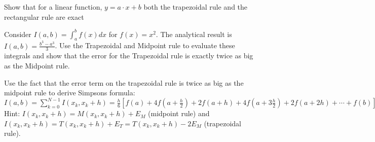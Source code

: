 \documentclass[graybox,sectrefs,envcountresetchap,open=right,final]{svmonodo}
\makeatletter
\newenvironment{doconceexercise}{}{}
\newcounter{doconceexercisecounter}%
\newcommand\listofexercises{
\chapter*{List of Exercises
          \@mkboth{List of Exercises}{List of Exercises}}
\markboth{List of Exercises}{List of Exercises}
\@starttoc{loe}
}
\makeatother
\begin{document}
\begin{doconceexercise}

                             


Show that for a linear function, $y=a\cdot x+b$ both the trapezoidal rule and the rectangular rule are exact



Consider $I(a,b)=\int_a^bf(x)dx$ for $f(x)=x^2$. The analytical result is $I(a,b)=\frac{b^3-a^3}{3}$. Use the Trapezoidal and 
  Midpoint rule to evaluate these integrals and show that the error for the Trapezoidal rule is exactly twice as big as the Midpoint rule.



Use the fact that the error term on the trapezoidal rule is twice as big as the midpoint rule to derive Simpsons formula: $I(a,b)=\sum_{k=0}^{N-1}I(x_k,x_k+h)=\frac{h}{6}\left[f(a)+ 4f(a+\frac{h}{2})+2f(a+h)+4f(a+3\frac{h}{2})+2f(a+2h)+\cdots+f(b)\right]$ Hint: $I(x_k,x_k+h)=M(x_k,x_k+h)+E_M$ (midpoint rule) and $I(x_k,x_k+h)=T(x_k,x_k+h)+E_T=T(x_k,x_k+h)-2E_M$ (trapezoidal rule).


\end{doconceexercise}
\end{document}
